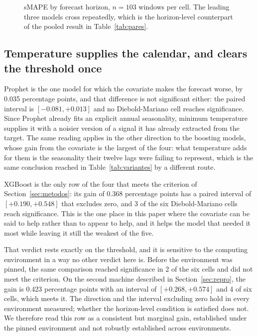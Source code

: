 \begin{figure}[htbp]
\centering

\caption{sMAPE by forecast horizon, $n=103$ windows per cell. The leading three models
cross repeatedly, which is the horizon-level counterpart of the pooled result in
Table~\ref{tab:pares}.}
\label{fig:horizonte}
\end{figure}

\subsection{Temperature supplies the calendar, and clears the threshold once}



Prophet is the one model for which the covariate makes the forecast worse, by 0.035
percentage points, and that difference is not significant either: the paired interval is
$[-0.081, +0.013]$ and no Diebold-Mariano cell reaches significance. Since Prophet already
fits an explicit annual seasonality, minimum temperature supplies it with a noisier version
of a signal it has already extracted from the target. The same reading applies in the other
direction to the boosting models, whose gain from the covariate is the largest of the four:
what temperature adds for them is the seasonality their twelve lags were failing to
represent, which is the same conclusion reached in Table~\ref{tab:variantes} by a different
route.

XGBoost is the only row of the four that meets the criterion of Section~\ref{sec:metodos}: its
gain of 0.368 percentage points has a paired interval of $[+0.190, +0.548]$ that excludes
zero, and 3 of the six Diebold-Mariano cells reach significance. This is the one place in
this paper where the covariate can be said to help rather than to appear to help, and it helps
the model that needed it most while leaving it still the weakest of the five.

That verdict rests exactly on the threshold, and it is sensitive to the computing
environment in a way no other verdict here is. Before the environment was pinned, the same
comparison reached significance in 2 of the six cells and did not meet the criterion. On the
second machine described in Section~\ref{sec:repro}, the gain is 0.423 percentage points
with an interval of $[+0.268, +0.574]$ and 4 of six cells, which meets it. The direction and
the interval excluding zero hold in every environment measured; whether the horizon-level
condition is satisfied does not. We therefore read this row as a consistent but marginal
gain, established under the pinned environment and not robustly established across
environments.

